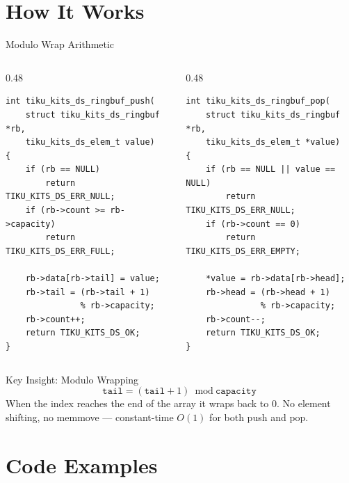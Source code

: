 \documentclass[aspectratio=169, 10pt]{beamer}
\begin{document}
\section{How It Works}

\begin{frame}[fragile]{Modulo Wrap Arithmetic}
\begin{columns}[T]
\begin{column}{0.48\textwidth}
\begin{lstlisting}[style=cstyle,
  title={push --- write at tail, wrap}]
int tiku_kits_ds_ringbuf_push(
    struct tiku_kits_ds_ringbuf *rb,
    tiku_kits_ds_elem_t value)
{
    if (rb == NULL)
        return TIKU_KITS_DS_ERR_NULL;
    if (rb->count >= rb->capacity)
        return TIKU_KITS_DS_ERR_FULL;

    rb->data[rb->tail] = value;
    rb->tail = (rb->tail + 1)
               % rb->capacity;
    rb->count++;
    return TIKU_KITS_DS_OK;
}
\end{lstlisting}
\end{column}

\begin{column}{0.48\textwidth}
\begin{lstlisting}[style=cstyle,
  title={pop --- read from head, wrap}]
int tiku_kits_ds_ringbuf_pop(
    struct tiku_kits_ds_ringbuf *rb,
    tiku_kits_ds_elem_t *value)
{
    if (rb == NULL || value == NULL)
        return TIKU_KITS_DS_ERR_NULL;
    if (rb->count == 0)
        return TIKU_KITS_DS_ERR_EMPTY;

    *value = rb->data[rb->head];
    rb->head = (rb->head + 1)
               % rb->capacity;
    rb->count--;
    return TIKU_KITS_DS_OK;
}
\end{lstlisting}
\end{column}
\end{columns}

\vspace{0.3em}
\begin{block}{Key Insight: Modulo Wrapping}
\[
  \texttt{tail} = (\texttt{tail} + 1) \bmod \texttt{capacity}
\]
When the index reaches the end of the array it wraps back to 0.
No element shifting, no memmove --- constant-time $O(1)$ for both push and pop.
\end{block}
\end{frame}

\section{Code Examples}
\end{document}
